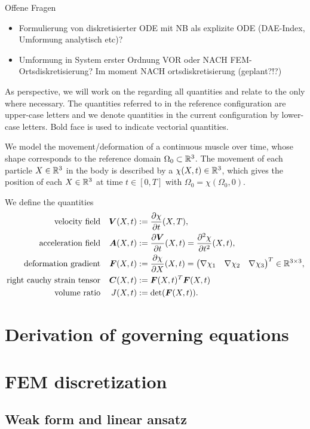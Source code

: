 \documentclass[a4paper,11pt]{article}
\newcommand{\Or}{\Omega_0}
\newcommand{\m}[1]{\ensuremath{\left(\begin{matrix}#1\end{matrix}\right)}}
\begin{document}
Offene Fragen
\begin{itemize}
  \item Formulierung von diskretisierter ODE mit NB als explizite ODE (DAE-Index, Umformung analytisch etc)?
  \item Umformung in System erster Ordnung VOR oder NACH FEM-Ortsdiskretisierung?
  Im moment NACH ortsdiskretisierung (geplant?!?)
\end{itemize}

As perspective, we will work on the  regarding all quantities and relate to the  only where necessary.
The quantities referred to in the reference configuration are upper-case letters and we denote quantities in the current configuration by lower-case letters.
Bold face is used to indicate vectorial quantities.

We model the movement/deformation of a continuous muscle over time, whose shape corresponds to the reference domain $\Or\subset\R^3$.
The movement of each particle $X\in\mathbb{R}^3$ in the body is described by a  $\chi(X,t)\in\mathbb{R}^3$, which gives the position of each $X\in\mathbb{R}^3$ at time
$t\in[0,T]$ with $\Or = \chi(\Or,0)$.

We define the quantities
\begin{align}
	\text{velocity field} && \vV(X,t) &:= \d{\chi}{t}(X,T),\\
	\text{acceleration field} && \vA(X,t) &:= \d{\vV}{t}(X,t) = \dd{\chi}{t}(X,t),\\
	\text{deformation gradient} && \vF(X,t) &:= \d{\chi}{X}(X,t) = \m{\nabla \chi_1 & \nabla \chi_2 & \nabla \chi_3}^T \in \R^{3\times 3},\\
	\text{right cauchy strain tensor} && \vC(X,t) &:= \vF(X,t)^T\vF(X,t)\\
	\text{volume ratio} && J(X,t) &:= \det(\vF(X,t)).
\end{align}

\section{Derivation of governing equations}


\section{FEM discretization}

\subsection{Weak form and linear ansatz}

\end{document}
